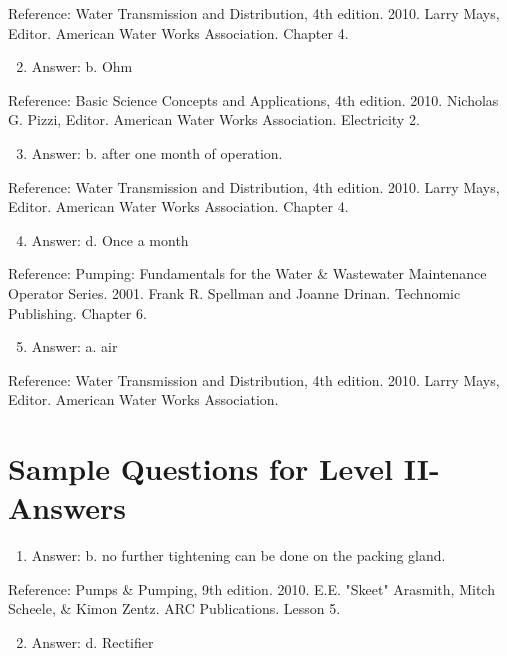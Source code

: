 \documentclass[10pt]{article}
\begin{document}
Reference: Water Transmission and Distribution, 4th edition. 2010. Larry Mays, Editor. American Water Works Association. Chapter 4.

\begin{enumerate}
  \setcounter{enumi}{1}
  \item Answer: b. Ohm
\end{enumerate}

Reference: Basic Science Concepts and Applications, 4th edition. 2010. Nicholas G. Pizzi, Editor. American Water Works Association. Electricity 2.

\begin{enumerate}
  \setcounter{enumi}{2}
  \item Answer: b. after one month of operation.
\end{enumerate}

Reference: Water Transmission and Distribution, 4th edition. 2010. Larry Mays, Editor. American Water Works Association. Chapter 4.

\begin{enumerate}
  \setcounter{enumi}{3}
  \item Answer: d. Once a month
\end{enumerate}

Reference: Pumping: Fundamentals for the Water \& Wastewater Maintenance Operator Series. 2001. Frank R. Spellman and Joanne Drinan. Technomic Publishing. Chapter 6.

\begin{enumerate}
  \setcounter{enumi}{4}
  \item Answer: a. air
\end{enumerate}

Reference: Water Transmission and Distribution, 4th edition. 2010. Larry Mays, Editor. American Water Works Association.

\section{Sample Questions for Level II-Answers}
\begin{enumerate}
  \item Answer: b. no further tightening can be done on the packing gland.
\end{enumerate}

Reference: Pumps \& Pumping, 9th edition. 2010. E.E. "Skeet" Arasmith, Mitch Scheele, \& Kimon Zentz. ARC Publications. Lesson 5.

\begin{enumerate}
  \setcounter{enumi}{1}
  \item Answer: d. Rectifier
\end{enumerate}
\end{document}
